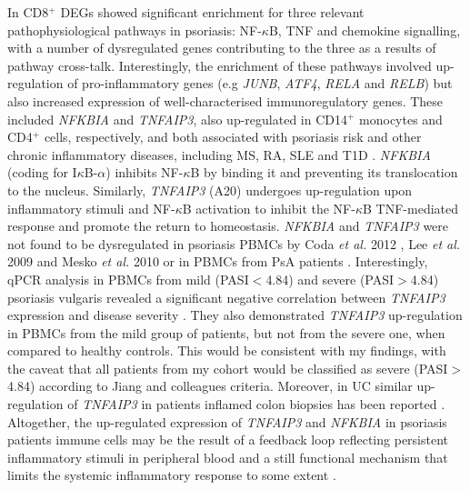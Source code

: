 In CD8$^+$ DEGs showed significant enrichment for three relevant pathophysiological pathways in psoriasis: NF-$\kappa$B, TNF and chemokine signalling, with a number of dysregulated genes contributing to the three as a results of pathway cross-talk. Interestingly, the enrichment of these pathways involved up-regulation of pro-inflammatory genes (e.g \textit{JUNB}, \textit{ATF4}, \textit{RELA} and \textit{RELB}) but also increased expression of well-characterised immunoregulatory genes. These included \textit{NFKBIA} and \textit{TNFAIP3}, also up-regulated in CD14$^+$ monocytes and CD4$^+$ cells, respectively, and both associated with psoriasis risk and other chronic inflammatory diseases, including MS, RA, SLE and T1D \parencite{Vereecke2011}. \textit{NFKBIA} (coding for I$\kappa$B-$\alpha$) inhibits NF-$\kappa$B by binding it and preventing its translocation to the nucleus. Similarly, \textit{TNFAIP3}  (A20) undergoes up-regulation upon inflammatory stimuli and NF-$\kappa$B activation to inhibit the NF-$\kappa$B TNF-mediated response and promote the return to homeostasis. \textit{NFKBIA} and \textit{TNFAIP3} were not found to be dysregulated in psoriasis PBMCs by Coda \textit{et al.} 2012 , Lee \textit{et al.} 2009 and Mesko \textit{et al.} 2010 or in PBMCs from PsA patients  \parencite{Dolcino2015}. Interestingly, qPCR analysis in PBMCs from mild (PASI$<$4.84) and severe (PASI$>$4.84) psoriasis vulgaris revealed a significant negative correlation between \textit{TNFAIP3} expression and disease severity \parencite{Jiang2012}. They also demonstrated \textit{TNFAIP3} up-regulation in PBMCs from the mild group of patients, but not from the severe one, when compared to healthy controls. This would be consistent with my findings, with the caveat that all patients from my cohort would be classified as severe (PASI$>$4.84) according to Jiang and colleagues criteria. Moreover, in UC similar up-regulation of \textit{TNFAIP3} in patients inflamed colon biopsies has been reported \parencite{Majumdar2017}. Altogether, the up-regulated expression of \textit{TNFAIP3} and \textit{NFKBIA} in psoriasis patients immune cells may be the result of a feedback loop reflecting persistent inflammatory stimuli in peripheral blood and a still functional mechanism that limits the systemic inflammatory response to some extent \parencite{Idel2003}. 

